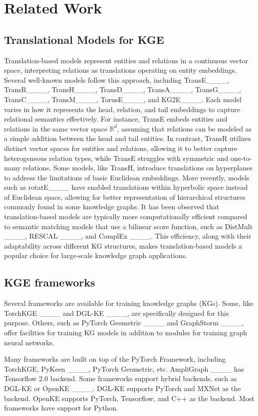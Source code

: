 \section{Related Work}
\subsection{Translational Models for KGE}
Translation-based models represent entities and relations in a continuous vector space, interpreting relations as translations operating on entity embeddings. Several well-known models follow this approach, including TransE____, TransR____, TransH____, TransD____, TransA____, TransG____,
TransC____, TransM____, 
TorusE____, and KG2E____. Each model varies in how it represents the head, relation, and tail embeddings to capture relational semantics effectively.
For instance, TransE embeds entities and relations in the same vector space $\mathbb{R}^d$, assuming that relations can be modeled as a simple addition between the head and tail entities. In contrast, TransR utilizes distinct vector spaces for entities and relations, allowing it to better capture heterogeneous relation types, while TransE struggles with symmetric and one-to-many relations.
Some models, like TransH, introduce translations on hyperplanes to address the limitations of basic Euclidean embeddings. More recently, models such as rotatE____ have enabled translations within hyperbolic space instead of Euclidean space, allowing for better representation of hierarchical structures commonly found in some knowledge graphs.
It has been observed that translation-based models are typically more computationally efficient compared to semantic matching models that use a bilinear score function, such as DistMult ____, RESCAL ____, and ComplEx ____. This efficiency, along with their adaptability across different KG structures, makes translation-based models a popular choice for large-scale knowledge graph applications.

\subsection{KGE frameworks}
Several frameworks are available for training knowledge graphs (KGs). Some, like TorchKGE ____ and DGL-KE ____, are specifically designed for this purpose. Others, such as PyTorch Geometric ____ and GraphStorm ____, offer facilities for training KG models in addition to modules for training graph neural networks. 

Many frameworks are built on top of the PyTorch Framework, including TorchKGE, PyKeen ____, PyTorch Geometric, etc. AmpliGraph ____ has Tensorflow 2.0 backend. Some frameworks support hybrid backends, such as DGL-KE or OpenKE ____. DGL-KE supports PyTorch and MXNet as the backend. OpenKE supports PyTorch, Tensorflow, and C++ as the backend. Most frameworks have support for Python. 

